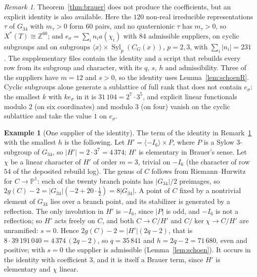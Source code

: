 \documentclass[11pt]{amsart}
\theoremstyle{definition}
\newtheorem{example}[theorem]{Example}
\theoremstyle{remark}
\newtheorem{remark}[theorem]{Remark}
\newcommand{\Z}{\mathbb Z}
\newcommand{\PP}{\mathbb P}
\begin{document}
\begin{remark}\label{rem:witness}
Theorem~\ref{thm:brauer} does not produce the coefficients, but an explicit identity is also available. Here the $120$ non-real irreducible representations $\tau$ of $G_{34}$ with $m_\tau>0$ form $60$ pairs, and no quaternionic $\tau$ has $m_\tau>0$, so $X^*(T)\cong\Z^{60}$; and $e_\sigma=\sum_in_ia(\chi_i)$ with $84$ admissible suppliers, on cyclic subgroups and on subgroups $\langle x\rangle\times\operatorname{Syl}_p(C_G(x))$, $p=2,3$, with $\sum_i|n_i|=231$. The supplementary files contain the identity and a script that rebuilds every row from its subgroup and character, with its $q$, $s$, $h$ and admissibility. Three of the suppliers have $m=12$ and $s>0$, so the identity uses Lemma~\ref{lem:schoenR}. Cyclic subgroups alone generate a sublattice of full rank that does not contain $e_\sigma$: the smallest $k$ with $ke_\sigma$ in it is $31\,104=2^7\cdot3^5$, and explicit linear functionals modulo $2$ (on six coordinates) and modulo $3$ (on four) vanish on the cyclic sublattice and take the value $1$ on $e_\sigma$.
\end{remark}

\begin{example}[One supplier of the identity]\label{ex:supplier}
The term of the identity in Remark~\ref{rem:witness} with the smallest $h$ is the following. Let $H'=\langle-I_6\rangle\times P$, where $P$ is a Sylow $3$-subgroup of $G_{34}$, so $|H'|=2\cdot3^7=4\,374$; $H'$ is elementary in Brauer's sense. Let $\chi$ be a linear character of $H'$ of order $m=3$, trivial on $-I_6$ (the character of row $54$ of the deposited rebuild log). The genus of $C$ follows from Riemann--Hurwitz for $C\to\PP^1$: each of the twenty branch points has $|G_{34}|/2$ preimages, so $2g(C)-2=|G_{34}|(-2+20\cdot\tfrac12)=8|G_{34}|$. A point of $C$ fixed by a nontrivial element of $G_{34}$ lies over a branch point, and its stabilizer is generated by a reflection. The only involution in $H'$ is $-I_6$, since $|P|$ is odd, and $-I_6$ is not a reflection; so $H'$ acts freely on $C$, and both $C\to C/H'$ and $C/\ker\chi\to C/H'$ are unramified: $s=0$. Hence $2g(C)-2=|H'|(2q-2)$, that is $8\cdot39\,191\,040=4\,374\,(2q-2)$, so $q=35\,841$ and $h=2q-2=71\,680$, even and positive; with $s=0$ the supplier is admissible (Lemma~\ref{lem:schoen}). It occurs in the identity with coefficient $3$, and it is itself a Brauer term, since $H'$ is elementary and $\chi$ linear.
\end{example}

\end{document}
